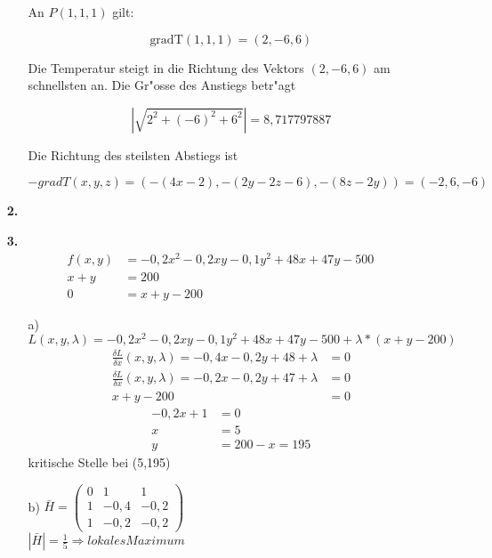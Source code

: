 \documentclass[a4paper,11pt,fleqn]{scrartcl}
\begin{document}
\begin{enumerate}
\begin{enumerate}
            An $P(1,1,1)$ gilt:

            \[\text{gradT}(1,1,1) = (2, -6, 6)\]

            Die Temperatur steigt in die Richtung des Vektors \( (2, -6, 6) \) am schnellsten an.
            Die Gr"osse des Anstiegs betr"agt 

            \[\left|\sqrt{2^2 + (-6)^2 + 6^2}\right| = 8,717797887\]

            Die Richtung des steilsten Abstiegs ist 

            \[-gradT(x,y,z) = (-(4x-2), -(2y-2z-6), -(8z-2y)) = (-2,6,-6)\]

    \end{enumerate}



\item[\textbf{2.}]


\item[\textbf{3.}]
    \begin{align*}
    	f(x,y)&=-0,2x^2-0,2xy-0,1y^2+48x+47y-500 \\
    	x+y&=200 \\
    	0&=x+y-200
    \end{align*}
    \begin{itemize}
    	\item[a)]
			$L(x,y,\lambda )=-0,2x^2-0,2xy-0,1y^2+48x+47y-500+ \lambda *\left( x+y-200 \right) $\\
			\begin{align*}
				\frac{\delta L}{\delta x}(x,y,\lambda)=-0,4x-0,2y+48+\lambda&=0\\
				\frac{\delta L}{\delta x}(x,y,\lambda)=-0,2x-0,2y+47+\lambda&=0\\
				x+y-200&=0
			\end{align*}
			\begin{align*}
				-0,2x+1&=0\\
				x&=5\\
				y&=200-x=195
			\end{align*}
			kritische Stelle bei (5,195)
		\item[b)]
			$\bar{H}=\left(\begin{matrix}
				0 & 1 & 1 \\
				1 & -0,4 & -0,2 \\
				1 & -0,2 & -0,2 
			\end{matrix}\right)$\\
			$|\bar{H}|=\frac{1}{5} \Rightarrow lokales Maximum $
    \end{itemize}


\end{enumerate}
\end{document}
